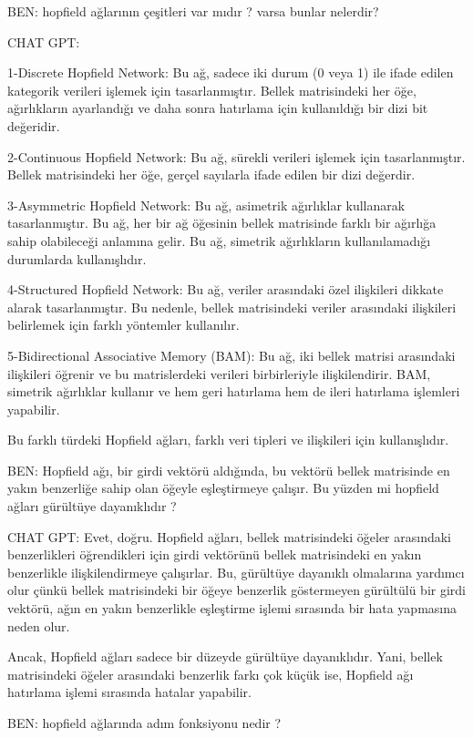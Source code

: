 \documentclass[11pt]{article}
\begin{document}
BEN: hopfield ağlarının çeşitleri var mıdır ? varsa bunlar nelerdir?

CHAT GPT:

1-Discrete Hopfield Network: Bu ağ, sadece iki durum (0 veya 1) ile ifade edilen kategorik verileri işlemek için tasarlanmıştır. Bellek matrisindeki her öğe, ağırlıkların ayarlandığı ve daha sonra hatırlama için kullanıldığı bir dizi bit değeridir.

2-Continuous Hopfield Network: Bu ağ, sürekli verileri işlemek için tasarlanmıştır. Bellek matrisindeki her öğe, gerçel sayılarla ifade edilen bir dizi değerdir.

3-Asymmetric Hopfield Network: Bu ağ, asimetrik ağırlıklar kullanarak tasarlanmıştır. Bu ağ, her bir ağ öğesinin bellek matrisinde farklı bir ağırlığa sahip olabileceği anlamına gelir. Bu ağ, simetrik ağırlıkların kullanılamadığı durumlarda kullanışlıdır.

4-Structured Hopfield Network: Bu ağ, veriler arasındaki özel ilişkileri dikkate alarak tasarlanmıştır. Bu nedenle, bellek matrisindeki veriler arasındaki ilişkileri belirlemek için farklı yöntemler kullanılır.

5-Bidirectional Associative Memory (BAM): Bu ağ, iki bellek matrisi arasındaki ilişkileri öğrenir ve bu matrislerdeki verileri birbirleriyle ilişkilendirir. BAM, simetrik ağırlıklar kullanır ve hem geri hatırlama hem de ileri hatırlama işlemleri yapabilir.

Bu farklı türdeki Hopfield ağları, farklı veri tipleri ve ilişkileri için kullanışlıdır.

BEN: Hopfield ağı, bir girdi vektörü aldığında, bu vektörü bellek matrisinde en yakın benzerliğe sahip olan öğeyle eşleştirmeye çalışır. Bu yüzden mi hopfield ağları gürültüye dayanıklıdır ?

CHAT GPT: Evet, doğru. Hopfield ağları, bellek matrisindeki öğeler arasındaki benzerlikleri öğrendikleri için girdi vektörünü bellek matrisindeki en yakın benzerlikle ilişkilendirmeye çalışırlar. Bu, gürültüye dayanıklı olmalarına yardımcı olur çünkü bellek matrisindeki bir öğeye benzerlik göstermeyen gürültülü bir girdi vektörü, ağın en yakın benzerlikle eşleştirme işlemi sırasında bir hata yapmasına neden olur.

Ancak, Hopfield ağları sadece bir düzeyde gürültüye dayanıklıdır. Yani, bellek matrisindeki öğeler arasındaki benzerlik farkı çok küçük ise, Hopfield ağı hatırlama işlemi sırasında hatalar yapabilir.

BEN: hopfield ağlarında adım fonksiyonu nedir ?
\end{document}

